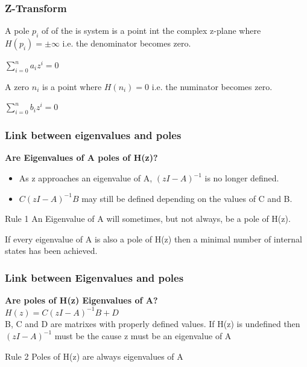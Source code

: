 \begin{frame}
	\frametitle{Z-Transform}
	\begin{definition}
		A pole $p_i$ of of the is system is a point int the complex z-plane where $H(p_i) = \pm \infty$ i.e. the denominator becomes zero.\\
		\begin{center}
			$\sum\limits_{i=0}^{n}a_iz^{i} = 0$
		\end{center}
		
	\end{definition}
	\begin{definition}
		A zero $n_i$ is a point where $H(n_i)=0$ i.e. the numinator becomes zero.\\
		\begin{center}
			$\sum\limits_{i=0}^{n}b_iz^{i} = 0$
		\end{center}
	\end{definition}
\end{frame}
\begin{frame}
	\frametitle{Link between eigenvalues and poles}
	\textbf{Are Eigenvalues of A poles of H(z)?}\\
	\small{
	\begin{itemize}
			\item As z approaches an eigenvalue of A, $(zI-A)^{-1}$ is no longer defined.\\
			\item $C(zI-A)^{-1}B$	may still be defined depending on the values of C and B.
	\end{itemize}
}
	\begin{block}{Rule 1}
			An Eigenvalue of A will sometimes, but not always, be a pole of H(z).
	\end{block}
	\begin{definition}
		If every eigenvalue of A is also a pole of H(z) then a minimal number of internal states has been achieved.
	\end{definition}
	
	
\end{frame}
\begin{frame}
	\frametitle{Link between Eigenvalues and poles}
	\textbf{Are poles of H(z) Eigenvalues of A?}\\
	$H(z) = C(zI-A)^{-1}B + D$ \\
	B, C and D are matrixes with properly defined values.
	If H(z) is undefined then $(zI-A)^{-1}$ must be the cause
	z must be an eigenvalue of A
	\begin{block}{Rule 2}
		Poles of H(z) are always eigenvalues of A 
	\end{block}
\end{frame}
